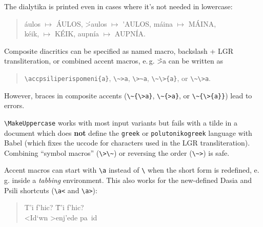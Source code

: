 \documentclass[a4paper,polutonikogreek,british]{article}
\begin{document}
\begin{itemize}
  The dialytika is printed even in cases where it's not needed
  in lowercase: %
  \begin{quote} 
    \'aulos $\mapsto$ \MakeUppercase{\'aulos},
    \'>aulos $\mapsto$ \MakeUppercase{\'\>aulos}, 
    m\'aina $\mapsto$ \MakeUppercase{m\'aina},\\
    k\'eik, $\mapsto$ \MakeUppercase{k\'eik},
    \>aupn\'ia $\mapsto$ \MakeUppercase{\>aupn\'ia}.
  \end{quote}
\end{itemize}

 Composite diacritics can be specified as
named macro, backslash + LGR transliteration, or combined accent macros, 
e.\,g. \textgreek{\~>a} can be written as
\begin{quote}
  \verb+\accpsiliperispomeni{a}+,
  \verb+\~>a+, \verb+\>~a+,
  \verb+\~\>{a}+, or \verb+\~\>a+.
\end{quote}
However, braces in composite accents
(\verb+\~{\>a}+, \verb+\~{>a}+, or \verb+\~{\>{a}}+)
lead to errors.

\verb+\MakeUppercase+ works with most input variants but fails with a tilde
in a document which does \textbf{not} define the \texttt{greek} or
\texttt{polutonikogreek} language with Babel (which fixes the uccode for
characters used in the LGR transliteration).
Combining ``symbol macros'' (\verb+\>\~+) or reversing the order
(\verb+\~>+) is safe.

Accent macros can start with \verb|\a| instead of \verb|\| when the
short form is redefined, e.\,g. inside a \emph{tabbing} environment.
This also works for the new-defined Dasia and Psili shortcuts
(\verb|\a<| and \verb|\a>|):
%
\begin{quote}
\begin{tabbing}
T'i f'hic? \= T\a'i f\a'hic? \\
<Id`wn \> \a>enj\a'ede pa\a~id
\end{tabbing}
\end{quote}
\end{document}
